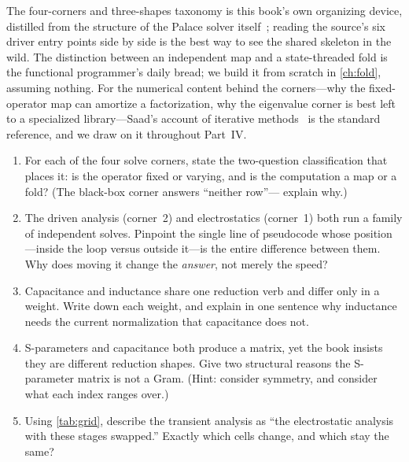 \furtherreading
The four-corners and three-shapes taxonomy is this book's own organizing
device, distilled from the structure of the Palace solver
itself~\citep{palace2023}; reading the source's six driver entry points side by
side is the best way to see the shared skeleton in the wild. The distinction
between an independent map and a state-threaded fold is the functional
programmer's daily bread; we build it from scratch in \cref{ch:fold}, assuming
nothing. For the numerical content behind the corners---why the fixed-operator
map can amortize a factorization, why the eigenvalue corner is best left to a
specialized library---Saad's account of iterative methods~\citep{saad2003} is
the standard reference, and we draw on it throughout Part~IV.

\exercisessection
\begin{enumerate}[nosep]
  \item For each of the four solve corners, state the two-question
  classification that places it: is the operator fixed or varying, and is the
  computation a map or a fold? (The black-box corner answers ``neither row''---
  explain why.)
  \item The driven analysis (corner~2) and electrostatics (corner~1) both run a
  family of independent solves. Pinpoint the single line of pseudocode whose
  position---inside the loop versus outside it---is the entire difference between
  them. Why does moving it change the \emph{answer}, not merely the speed?
  \item Capacitance and inductance share one reduction verb and differ only in a
  weight. Write down each weight, and explain in one sentence why inductance
  needs the current normalization that capacitance does not.
  \item S-parameters and capacitance both produce a matrix, yet the book insists
  they are different reduction shapes. Give two structural reasons the
  S-parameter matrix is not a Gram. (Hint: consider symmetry, and consider what
  each index ranges over.)
  \item Using \cref{tab:grid}, describe the transient analysis as ``the
  electrostatic analysis with these stages swapped.'' Exactly which cells change,
  and which stay the same?
\end{enumerate}
